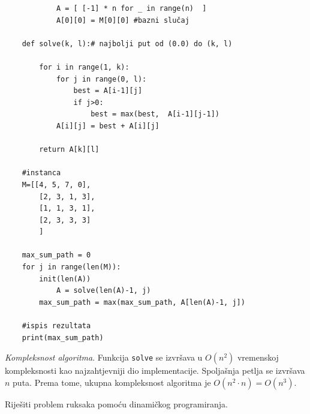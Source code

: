 \begin{solution}
\begin{verbatim}
            A = [ [-1] * n for _ in range(n)  ]
            A[0][0] = M[0][0] #bazni slučaj
	
	def solve(k, l):# najbolji put od (0.0) do (k, l)
	    
	    for i in range(1, k):
	        for j in range(0, l):
	            best = A[i-1][j]  
	            if j>0:
	                best = max(best,  A[i-1][j-1])
	        A[i][j] = best + A[i][j]
	   
	    return A[k][l]

	#instanca
	M=[[4, 5, 7, 0],
    	[2, 3, 1, 3],
    	[1, 1, 3, 1],
    	[2, 3, 3, 3]
        ]	

	max_sum_path = 0
	for j in range(len(M)):
		init(len(A))
	        A = solve(len(A)-1, j)
		max_sum_path = max(max_sum_path, A[len(A)-1, j])
	
	#ispis rezultata	
	print(max_sum_path)
\end{verbatim}

\textit{Kompleksnost algoritma}. Funkcija \texttt{solve} se izvršava u $O(n^2)$ vremenskoj kompleksnosti kao najzahtjevniji dio implementacije. Spoljašnja petlja se izvršava $n$ puta.  Prema tome, ukupna kompleksnost algoritma je $O(n^2 \cdot n)=O(n^3)$.

\end{solution}



\begin{example}
	Riješiti problem ruksaka pomoću dinamičkog programiranja. 
\end{example}

